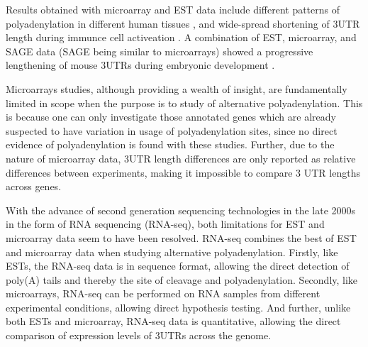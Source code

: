 Results obtained with microarray and EST data include different patterns of
polyadenylation in different human tissues \cite{zhang_biased_2005}, and
wide-spread shortening of 3\p UTR length during immunce cell activeation
\cite{sandberg_proliferating_2008}. A combination of EST, microarray, and SAGE
data (SAGE being similar to microarrays) showed a progressive lengthening of
mouse 3\p UTRs during embryonic development \cite{ji_progressive_2009}.

Microarrays studies, although providing a wealth of insight, are fundamentally
limited in scope when the purpose is to study of alternative polyadenylation.
This is because one can only investigate those annotated genes which are
already suspected to have variation in usage of polyadenylation sites, since no
direct evidence of polyadenylation is found with these studies. Further, due to
the nature of microarray data, 3\p UTR length differences are only reported as
relative differences between experiments, making it impossible to compare 3\p
UTR lengths across genes.

With the advance of second generation sequencing technologies in the late 2000s
in the form of RNA sequencing (RNA-seq), both limitations for EST and
microarray data seem to have been resolved. RNA-seq combines the best of EST
and microarray data when studying alternative polyadenylation. Firstly, like
ESTs, the RNA-seq data is in sequence format, allowing the direct detection
of poly(A) tails and thereby the site of cleavage and polyadenylation.
Secondly, like microarrays, RNA-seq can be performed on RNA samples from
different experimental conditions, allowing direct hypothesis testing. And
further, unlike both ESTs and microarray, RNA-seq data is quantitative,
allowing the direct comparison of expression levels of 3\p UTRs across the
genome.

